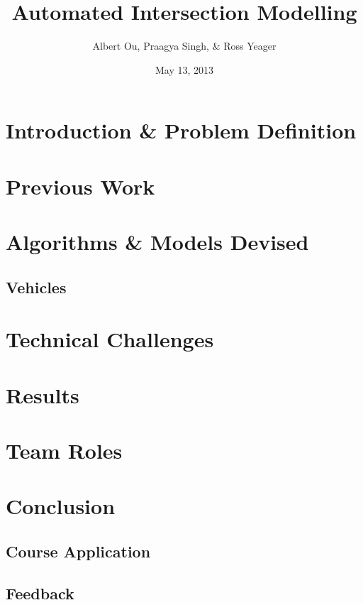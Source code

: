 \documentclass[10pt]{article}
\title{Automated Intersection Modelling}
\author{Albert Ou, Praagya Singh, & Ross Yeager}
\date{May 13, 2013}
\begin{document}
\maketitle
\section{Introduction & Problem Definition}

\section{Previous Work}

\section{Algorithms & Models Devised}

\subsection{Vehicles}

\section{Technical Challenges}

\section{Results}

\section{Team Roles}

\section{Conclusion}

\subsection{Course Application}

\subsection{Feedback}
\end{document}
